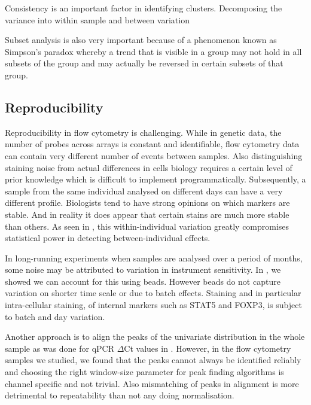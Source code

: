 Consistency is an important factor in identifying clusters.
Decomposing the variance into within sample and between variation

Subset analysis is also very important because of a phenomenon known as Simpson’s paradox whereby a trend that is visible in a group may not hold in all subsets of the group and may actually be reversed in certain subsets of that group.

\subsection{Reproducibility}

Reproducibility in flow cytometry is challenging.
While in genetic data, the number of probes across arrays is constant and identifiable,
flow cytometry data can contain very different number of events between samples.
Also distinguishing staining noise from actual differences in cells biology requires a certain level of prior knowledge which is difficult to implement programmatically.
Subsequently, a sample from the same individual analysed on different days can have a very different profile.
Biologists tend to have strong opinions on which markers are stable. And in reality it does appear that certain stains are much more stable than others.
As seen in , this within-individual variation greatly compromises statistical power in detecting between-individual effects.

In long-running experiments when samples are analysed over a period of months, some noise may be attributed to variation in instrument sensitivity.
In , we showed we can account for this using beads.
However beads do not capture variation on shorter time scale or due to batch effects.
Staining and in particular intra-cellular staining, of internal markers such as STAT5 and FOXP3, is subject to batch and day variation.

Another approach is to align the peaks of the univariate distribution in the whole sample as was done for qPCR $\Delta$Ct values in .
However, in the flow cytometry samples we studied, we found that the peaks cannot always be identified reliably and choosing the right window-size parameter for peak finding algorithms is channel specific and not trivial.
Also mismatching of peaks in alignment is more detrimental to repeatability than not any doing normalisation.





